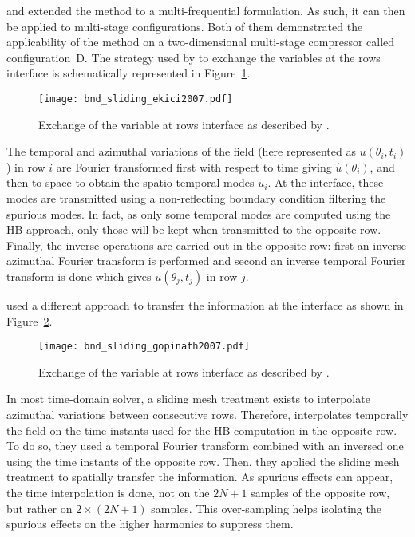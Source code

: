 \citet{Ekici2007} and \citet{Gopinath2007}
extended the method to a multi-frequential formulation. 
As such, it can then be applied to multi-stage
configurations. Both of them demonstrated the applicability of
the method on
a two-dimensional multi-stage compressor called
configuration~D. 
The strategy used by \citet{Ekici2007} 
to exchange the variables at
the rows interface is schematically represented 
in Figure~\ref{fig:bnd_sliding_ekici2007}.
\begin{figure}[htp]
  \centering
  \texttt{[image: bnd\_sliding\_ekici2007.pdf]}
  \caption{Exchange of the variable at rows interface as described by \citet{Ekici2007}.}
  \label{fig:bnd_sliding_ekici2007}
\end{figure}
The temporal and azimuthal variations 
of the field (here represented as $u (\theta_i, t_i)$)
in row $i$ are Fourier transformed first with
respect to time giving $\widehat{u} (\theta_i)$, and then
to space to obtain the spatio-temporal modes $\widetilde{u}_i$.
At the interface, these modes are transmitted using a non-reflecting
boundary condition filtering the spurious modes. In fact, as only some
temporal modes are computed using the HB approach, only
those will be kept when transmitted to the opposite row.
Finally, the inverse operations are carried out in
the opposite row: first an inverse
azimuthal Fourier transform is performed and second an inverse
temporal Fourier transform is done which gives $u (\theta_j, t_j)$
in row $j$.

\citet{Gopinath2007} used a different approach to transfer
the information at the interface as shown
in Figure~\ref{fig:bnd_sliding_gopinath2007}. 
\begin{figure}[htp]
  \centering
  \texttt{[image: bnd\_sliding\_gopinath2007.pdf]}
  \caption{Exchange of the variable at rows interface as described by \citet{Gopinath2007}.}
  \label{fig:bnd_sliding_gopinath2007}
\end{figure}
In most time-domain solver,
a sliding mesh treatment exists to interpolate azimuthal variations
between consecutive rows. Therefore, \citet{Gopinath2007}
interpolates temporally the field on the time instants used for
the HB computation in
the opposite row. To do so, they used a temporal Fourier
transform combined with an inversed one using the time instants
of the opposite row.
Then, they applied the sliding mesh treatment
to spatially transfer the information. As spurious effects
can appear, the time interpolation is done, not on the $2N+1$ samples
of the opposite row, but rather on $2 \times (2N+1)$ samples. This over-sampling
helps isolating the spurious effects on the higher harmonics to suppress them.


